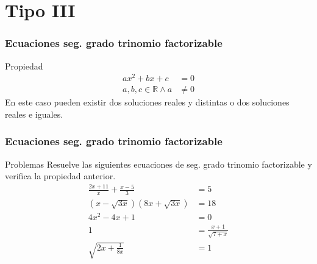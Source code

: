 \documentclass[12pt,spanish,x11names]{beamer}
\def\RR{\mathbb{R}}
\begin{document}
\section{Tipo III}
\begin{frame}
  \frametitle{Ecuaciones seg. grado trinomio factorizable}
  \begin{block}{Propiedad}
    \begin{align*}
      ax^2+bx+c&=0\\
      a,b,c\in\RR\wedge a&\neq0
    \end{align*}
    En este caso pueden existir dos soluciones reales y distintas o dos soluciones reales e iguales.
  \end{block}
\end{frame}
\begin{frame}
  \frametitle{Ecuaciones seg. grado trinomio factorizable}
  \begin{exampleblock}{Problemas}
    Resuelve las siguientes ecuaciones de seg. grado trinomio factorizable y verifica la
    propiedad anterior.
    \begin{align}
      \frac{2x+11}{x}+\frac{x-5}{3}&=5\\
      (x-\sqrt{3x})(8x+\sqrt{3x})&=18\\
      4x^2-4x+1&=0\\
      1&=\frac{x+1}{\sqrt{7+x}}\\
      \sqrt{2x+\frac{1}{8x}}&=1
    \end{align}
  \end{exampleblock}
\end{frame}
\end{document}
